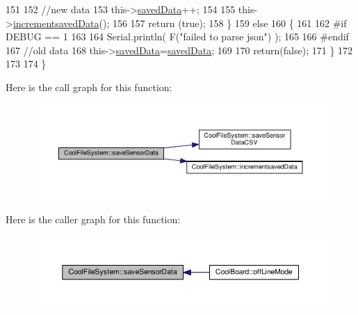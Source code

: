 \begin{DoxyCode}
151 
152         \textcolor{comment}{//new data}
153         this->\hyperlink{class_cool_file_system_ad9f5b739a32100f5f21270c3d9ee2b1d}{savedData}++;
154 
155         this->\hyperlink{class_cool_file_system_aae045125288f255f3e258073dcada2a6}{incrementsavedData}();
156         
157         \textcolor{keywordflow}{return} (\textcolor{keyword}{true});      
158     \}
159     \textcolor{keywordflow}{else}
160     \{
161     
162 \textcolor{preprocessor}{    #if DEBUG == 1}
163 
164         Serial.println( F(\textcolor{stringliteral}{"failed to parse json"}) );
165     
166 \textcolor{preprocessor}{    #endif}
167         \textcolor{comment}{//old data}
168         this->\hyperlink{class_cool_file_system_ad9f5b739a32100f5f21270c3d9ee2b1d}{savedData}=\hyperlink{class_cool_file_system_ad9f5b739a32100f5f21270c3d9ee2b1d}{savedData};
169 
170         \textcolor{keywordflow}{return}(\textcolor{keyword}{false});
171     \}
172     
173 
174 \}
\end{DoxyCode}
Here is the call graph for this function\+:\nopagebreak
\begin{figure}[H]
\begin{center}
\leavevmode
\includegraphics[width=350pt]{db/d0c/class_cool_file_system_afa3a4feae94871d4d3b6bebb701c2e67_cgraph}
\end{center}
\end{figure}
Here is the caller graph for this function\+:\nopagebreak
\begin{figure}[H]
\begin{center}
\leavevmode
\includegraphics[width=350pt]{db/d0c/class_cool_file_system_afa3a4feae94871d4d3b6bebb701c2e67_icgraph}
\end{center}
\end{figure}
\mbox{\label{class_cool_file_system_ab78704d5d21ce10fc6f1138ab5ab46c8}} 
